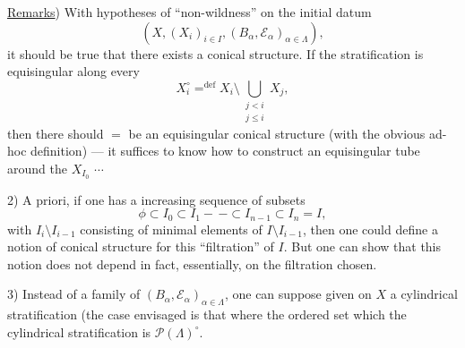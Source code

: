 
\quad \uline{Remarks}) With hypotheses of ``non-wildness'' on the initial datum
\[
 (X,(X_i)_{i\in I},(B_\alpha,\mathcal E_\alpha)_{\alpha\in\Lambda}),
\]
it should be true that there exists a conical structure. If the stratification
 is equisingular along every
\[
 X_i^\circ\mathrel{\mathop=^{\mathrm{def}}}
 X_i\setminus\bigcup_{\substack{j<i\\j\le i}}X_j,
\]
then there should \(=\) be an equisingular conical structure
(with the obvious ad-hoc definition) --- it suffices to know how to construct
an equisingular tube around the \(X_{I_0}\) \(\cdots\)

2) A priori, if one has a  increasing sequence
of subsets
\[
 \phi\subset I_0\subset I_1-\, -\subset I_{n-1}\subset I_n=I,
\]
with 
 \(I_i\setminus I_{i-1}\) consisting of minimal elements
of \(I\setminus I_{i-1}\), then one could define
 a notion of conical structure
for this ``filtration'' of \(I\). But one
can show that this notion does not depend
in fact, essentially, on the filtration
chosen.

3) Instead of a family of \((B_\alpha,\mathcal E_\alpha)_{\alpha\in\Lambda}\),
one can suppose given on \(X\) a
cylindrical stratification  (the case envisaged
is that where the ordered set which 
 the cylindrical stratification is
\(\mathcal P(\Lambda)^\circ\).

